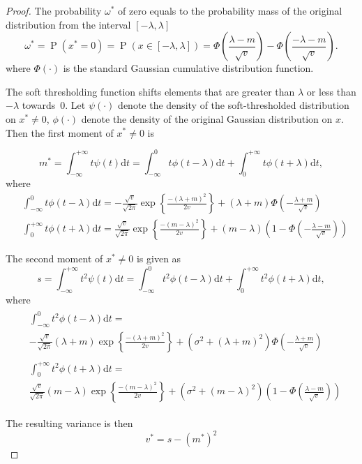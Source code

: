 \documentclass{article}
\begin{document}
\begin{proof}

The probability $\omega^*$ of zero equals to the probability mass of the original distribution from the interval $[-\lambda, \lambda]$
\begin{equation}
\omega^* =\operatorname{P}(x^*=0) = \operatorname{P}(x \in [-\lambda, \lambda]) = \Phi\left(\frac{\lambda-m}{\sqrt{v}}\right) - \Phi\left(\frac{-\lambda-m}{\sqrt{v}}\right).
\end{equation}
where $\Phi(\cdot)$ is the standard Gaussian cumulative distribution function.

The soft thresholding function shifts elements that are greater than $\lambda$  or less than $-\lambda$ towards~$0$. Let $\psi(\cdot)$ denote the density of the soft-thresholded distribution on $x^* \neq 0$, $\phi(\cdot)$ denote the density of the original Gaussian distribution on $x$. Then the first moment of $x^* \neq 0$ is

\begin{equation}
\label{eq:thr_first_moment}
m^* = \int_{-\infty}^{+\infty}t\psi(t)\mathrm{d}t= \int_{-\infty}^{0}t\phi(t-\lambda)\mathrm{d}t + \int_{0}^{+\infty}t\phi(t+\lambda)\mathrm{d}t,
\end{equation}
where
\begin{align}
&\int_{-\infty}^{0}t\phi(t-\lambda)\mathrm{d}t = -\frac{\sqrt{v}}{\sqrt{2\pi}} \exp\left\{\frac{-(\lambda+m)^2}{2v}\right\} + (\lambda+m)\Phi\left(-\frac{\lambda+m}{\sqrt{v}}\right)\\
&\int_{0}^{+\infty}t\phi(t+\lambda)\mathrm{d}t = \frac{\sqrt{v}}{\sqrt{2\pi}} \exp\left\{\frac{-(m - \lambda)^2}{2v}\right\} + (m - \lambda)\left(1 - \Phi\left(-\frac{\lambda-m}{\sqrt{v}}\right)\right)
\end{align}

The second moment of $x^* \neq 0$ is given as
\begin{equation}
\label{eq:thr_second_moment}
s = \int_{-\infty}^{+\infty}t^2\psi(t)\mathrm{d}t = \int_{-\infty}^{0}t^2\phi(t-\lambda)\mathrm{d}t + \int_{0}^{+\infty}t^2\phi(t+\lambda)\mathrm{d}t,
\end{equation}
where
\begin{align}
\begin{split}
&\int_{-\infty}^{0}t^2\phi(t-\lambda)\mathrm{d}t = \\
&-\frac{\sqrt{v}}{\sqrt{2\pi}} (\lambda+m)\exp\left\{\frac{-(\lambda+m)^2}{2v}\right\} + (\sigma^2 + (\lambda+m)^2)\Phi\left(-\frac{\lambda+m}{\sqrt{v}}\right)
\end{split}\\
\begin{split}
&\int_{0}^{+\infty}t^2\phi(t+\lambda)\mathrm{d}t = \\
&\frac{\sqrt{v}}{\sqrt{2\pi}} (m - \lambda)\exp\left\{\frac{-(m - \lambda)^2}{2v}\right\} + (\sigma^2 + (m - \lambda)^2)\left(1 - \Phi\left(\frac{\lambda -m}{\sqrt{v}}\right)\right)
\end{split}
\end{align}

The resulting variance is then
\begin{equation}
v^* = s- (m^*)^2
\end{equation}
\end{proof}
\end{document}
